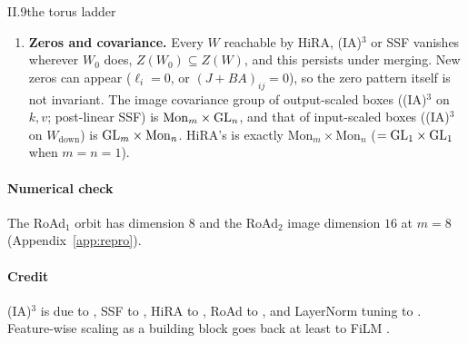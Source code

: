 \begin{proposition}{II.9}{the torus ladder}
\begin{enumerate}[label=(\alph*)]
    scaled rotations $\alpha_i\mathrm{Rot}(\theta_i)$ of output pairs. It is the left action of
    $\CO^+(2)^{m/2}\cong(\mathbb C^\times)^{m/2}$: it is \textbf{(IA)$^{\mathbf 3}$ over $\mathbb C$}. It multiplies the
    input Gram matrix of each output pair by $\alpha_i^2$. Since $\alpha_i$ may be $0$, its image is the orbit closure,
    a real-linear space of dimension exactly $m$ whenever no output-pair block of $W_0$ is zero. RoAd$_2$ and RoAd$_4$
    (HF \texttt{road\_2}, \texttt{road\_4}) let each block range over all of $M_2(\R)$. They realise the block-diagonal
    action of the monoid $M_2(\R)^{m/2}$ (its group part $\GL_2^{m/2}$ is non-abelian), with linear image
    $\{\mathrm{blockdiag}(R_i)W_0\}$ of dimension $2m$ when every pair block has rank $2$. For them the Gram statement
    and ``over $\mathbb C$'' fail, and RoAd$_4$ carries a positive-dimensional gauge (two dimensions per row). HF pairs
    output $j$ with $j+g/2$ inside each group of size $g$ (default $64$) rather than adjacent outputs as in the paper,
    and also rotates the bias; the statements above do not depend on the pairing.
  \item \textbf{Zeros and covariance.} Every $W$ reachable by HiRA, (IA)$^3$ or SSF vanishes wherever $W_0$ does,
    $Z(W_0)\subseteq Z(W)$, and this persists under merging. New zeros can appear ($\ell_i=0$, or $(J+BA)_{ij}=0$), so
    the zero pattern itself is not invariant. The image covariance group of output-scaled boxes ((IA)$^3$ on $k,v$;
    post-linear SSF) is $\mathrm{Mon}_m\times\mathrm{GL}_n$, and that of input-scaled boxes ((IA)$^3$ on $W_{\mathrm{down}}$) is
    $\mathrm{GL}_m\times\mathrm{Mon}_n$. HiRA's is exactly $\mathrm{Mon}_m\times\mathrm{Mon}_n$ ($=\mathrm{GL}_1\times\mathrm{GL}_1$ when
    $m=n=1$).
\end{enumerate}
\end{proposition}

\paragraph{Numerical check}
The RoAd$_1$ orbit has dimension $8$ and the RoAd$_2$ image dimension $16$ at $m=8$ (Appendix~\ref{app:repro}).

\paragraph{Credit}
(IA)$^3$ is due to \citet{liu2022few}, SSF to \citet{lian2022scaling}, HiRA to \citet{huang2025hira}, RoAd to
\citet{liao20243}, and LayerNorm tuning to \citet{zhao2023tuning}. Feature-wise scaling as a building block goes back at
least to FiLM \citep{perez2017film}.

